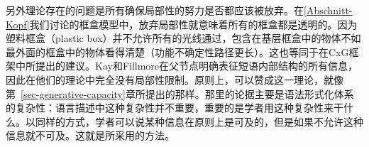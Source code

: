 另外理论存在的问题是所有确保局部性的努力是否都应该被放弃。在\ref{Abschnitt-Kopf}我们讨论的框盒模型中，放弃局部性就意味着所有的框盒都是透明的。因为塑料框盒（plastic box）并不允许所有的光线通过，包含在基层框盒中的物体不如最外面的框盒中的物体看得清楚（功能不确定性路径更长）。这也等同于\citet{KF99a}在CxG\indexcxgc 框架中所提出的建议。Kay和Fillmore在父节点明确表征短语内部结构的所有信息，因此在他们的理论中完全没有局部性限制。原则上，可以赞成这一理论，就像第~\ref{sec-generative-capacity}章所提出的那样。那里的论据主要是语法形式化体系的复杂性：语言描述中这种复杂性并不重要，重要的是学者用这种复杂性来干什么。以同样的方式，学者可以说某种信息在原则上是可及的，但是如果不允许这种信息就不可及。这就是\citet[--145]{ps}所采用的方法。

